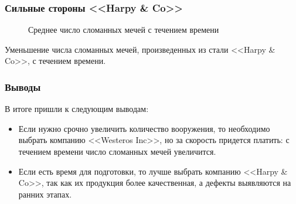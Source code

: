 \documentclass[10pt,pdf,hyperref={unicode}]{beamer}
\begin{document}
\begin{frame}
\frametitle{Сильные стороны <<Harpy \& Co>>} 
\begin{minipage}{0.4\textwidth}
 	\begin{figure}[L]
		\caption{Среднее число сломанных мечей с течением времени}
	\end{figure}
\end{minipage}
\hfill
\begin{minipage}{0.4\textwidth}
	Уменьшение числа сломанных мечей, произведенных из стали  <<Harpy \& Co>>, с течением времени.
\end{minipage}
\end{frame}

\begin{frame}
\frametitle{Выводы} 

В итоге пришли к следующим выводам:
\begin{itemize}
\item Если нужно срочно увеличить количество вооружения, то необходимо выбрать компанию <<Westeros Inc>>, но за скорость придется платить: с течением времени число сломанных мечей увеличится.
\item Если есть время для подготовки, то лучше выбрать компанию <<Harpy \& Co>>, так как их продукция более качественная, а дефекты выявляются на ранних этапах.
\end{itemize}
\end{frame}
\end{document}
